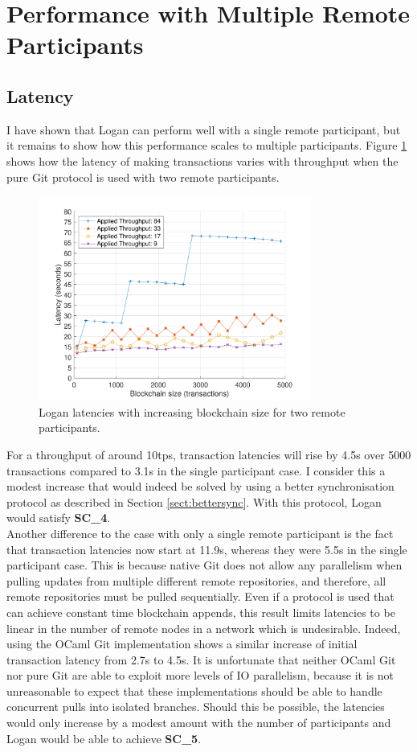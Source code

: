 \documentclass[12pt,a4paper,twoside,openright]{report}
\begin{document}
	\section{Performance with Multiple Remote Participants}
	\subsection{Latency}
	I have shown that Logan can perform well with a single remote participant, but it remains to show how this performance scales to multiple participants. 
	Figure \ref{figs:tworems} shows how the latency of making transactions varies with throughput when the pure Git protocol is used with two remote participants.
	\begin{figure}
		\centering
		\includegraphics[width=0.8\textwidth]{figs/2latencies_sizes_throughputs.pdf}
		\caption{Logan latencies with increasing blockchain size for two remote participants.}
		\label{figs:tworems}
	\end{figure}
	For a throughput of around 10tps, transaction latencies will rise by 4.5s over 5000 transactions compared to 3.1s in the single participant case.
	I consider this a modest increase that would indeed be solved by using a better synchronisation protocol as described in Section \ref{sect:bettersync}. 
	With this protocol, Logan would satisfy \textbf{SC\_4}.\\

	Another difference to the case with only a single remote participant is the fact that transaction latencies now start at 11.9s, whereas they were 5.5s in the single participant case.
	This is because native Git does not allow any parallelism when pulling updates from multiple different remote repositories, and therefore, all remote repositories must be pulled sequentially.
	Even if a protocol is used that can achieve constant time blockchain appends, this result limits latencies to be linear in the number of remote nodes in a network which is undesirable. 
	Indeed, using the OCaml Git implementation shows a similar increase of initial transaction latency from 2.7s to 4.5s.
	It is unfortunate that neither OCaml Git nor pure Git are able to exploit more levels of IO parallelism, because it is not unreasonable to expect that these implementations should be able to handle concurrent pulls into isolated branches. 
	Should this be possible, the latencies would only increase by a modest amount with the number of participants and Logan would be able to achieve \textbf{SC\_5}.\\
\end{document}
